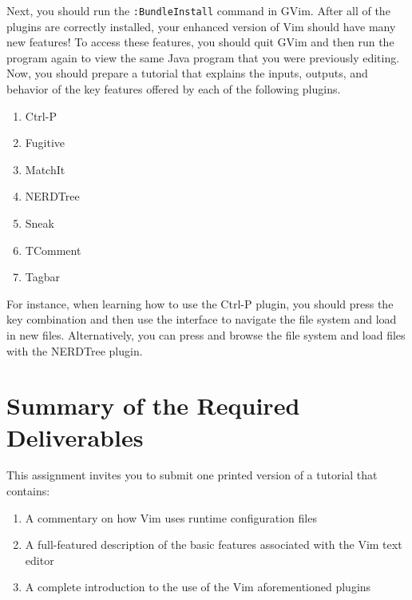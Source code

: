 Next, you should run the {\tt :BundleInstall} command in GVim.  After all of the plugins are correctly installed, your enhanced
version of Vim should have many new features! To access these features, you should quit GVim and then run the program again to
view the same Java program that you were previously editing.  Now, you should prepare a tutorial that explains the inputs,
outputs, and behavior of the key features offered by each of the following plugins.

\begin{enumerate}

  \item Ctrl-P
  \item Fugitive
  \item MatchIt
  \item NERDTree
  \item Sneak
  \item TComment
  \item Tagbar

\end{enumerate}

For instance, when learning how to use the Ctrl-P plugin, you should press the key combination {\tt <ctrl-p>} and then use the
interface to navigate the file system and load in new files.  Alternatively, you can press {\tt <F11>} and browse the file system
and load files with the NERDTree plugin.

\section*{Summary of the Required Deliverables}

This assignment invites you to submit one printed version of a tutorial that contains:

\begin{enumerate}

  \item A commentary on how Vim uses runtime configuration files

  \item A full-featured description of the basic features associated with the Vim text editor

  \item A complete introduction to the use of the Vim aforementioned plugins

\end{enumerate}

